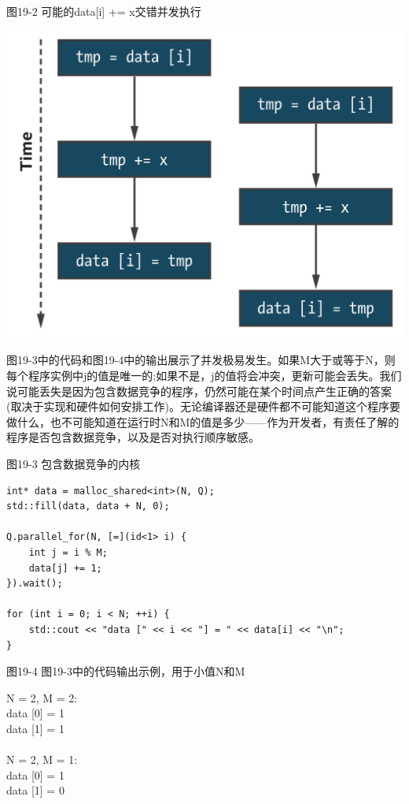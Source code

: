 \hspace*{\fill} \par %
图19-2 可能的data[i] += x交错并发执行
\begin{center}
	\includegraphics[width=1.0\textwidth]{content/chapter-19/images/3}
\end{center}

图19-3中的代码和图19-4中的输出展示了并发极易发生。如果M大于或等于N，则每个程序实例中j的值是唯一的;如果不是，j的值将会冲突，更新可能会丢失。我们说可能丢失是因为包含数据竞争的程序，仍然可能在某个时间点产生正确的答案(取决于实现和硬件如何安排工作)。无论编译器还是硬件都不可能知道这个程序要做什么，也不可能知道在运行时N和M的值是多少——作为开发者，有责任了解的程序是否包含数据竞争，以及是否对执行顺序敏感。\par

\hspace*{\fill} \par %
图19-3 包含数据竞争的内核
\begin{lstlisting}[caption={}]
int* data = malloc_shared<int>(N, Q);
std::fill(data, data + N, 0);

Q.parallel_for(N, [=](id<1> i) {
	int j = i % M;
	data[j] += 1;
}).wait();

for (int i = 0; i < N; ++i) {
	std::cout << "data [" << i << "] = " << data[i] << "\n";
}
\end{lstlisting}

\hspace*{\fill} \par %
图19-4 图19-3中的代码输出示例，用于小值N和M
\begin{tcolorbox}[colback=white,colframe=black]
N = 2, M = 2:\\
data [0] = 1\\
data [1] = 1\\
\\
N = 2, M = 1:\\
data [0] = 1\\
data [1] = 0
\end{tcolorbox}

